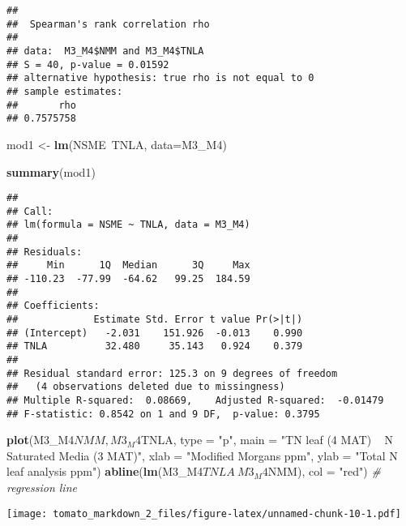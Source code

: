 \documentclass[]{article}
\newenvironment{Shaded}{\begin{snugshade}}{\end{snugshade}}
\newcommand{\KeywordTok}[1]{\textcolor[rgb]{0.13,0.29,0.53}{\textbf{{#1}}}}
\newcommand{\DataTypeTok}[1]{\textcolor[rgb]{0.13,0.29,0.53}{{#1}}}
\newcommand{\StringTok}[1]{\textcolor[rgb]{0.31,0.60,0.02}{{#1}}}
\newcommand{\CommentTok}[1]{\textcolor[rgb]{0.56,0.35,0.01}{\textit{{#1}}}}
\newcommand{\OtherTok}[1]{\textcolor[rgb]{0.56,0.35,0.01}{{#1}}}
\newcommand{\NormalTok}[1]{{#1}}
\begin{document}
\begin{verbatim}
## 
##  Spearman's rank correlation rho
## 
## data:  M3_M4$NMM and M3_M4$TNLA
## S = 40, p-value = 0.01592
## alternative hypothesis: true rho is not equal to 0
## sample estimates:
##       rho 
## 0.7575758
\end{verbatim}

\begin{Shaded}
\begin{Highlighting}[]
\NormalTok{mod1 <-}\StringTok{ }\KeywordTok{lm}\NormalTok{(NSME~TNLA, }\DataTypeTok{data=}\NormalTok{M3_M4)}

\KeywordTok{summary}\NormalTok{(mod1)}
\end{Highlighting}
\end{Shaded}

\begin{verbatim}
## 
## Call:
## lm(formula = NSME ~ TNLA, data = M3_M4)
## 
## Residuals:
##     Min      1Q  Median      3Q     Max 
## -110.23  -77.99  -64.62   99.25  184.59 
## 
## Coefficients:
##             Estimate Std. Error t value Pr(>|t|)
## (Intercept)   -2.031    151.926  -0.013    0.990
## TNLA          32.480     35.143   0.924    0.379
## 
## Residual standard error: 125.3 on 9 degrees of freedom
##   (4 observations deleted due to missingness)
## Multiple R-squared:  0.08669,    Adjusted R-squared:  -0.01479 
## F-statistic: 0.8542 on 1 and 9 DF,  p-value: 0.3795
\end{verbatim}

\begin{Shaded}
\begin{Highlighting}[]
\KeywordTok{plot}\NormalTok{(M3_M4$NMM, M3_M4$TNLA, }\DataTypeTok{type =} \StringTok{"p"}\NormalTok{, }\DataTypeTok{main =} \StringTok{"TN leaf (4 MAT) ~ N Saturated Media (3 MAT)"}\NormalTok{, }\DataTypeTok{xlab =} \StringTok{"Modified Morgans ppm"}\NormalTok{, }\DataTypeTok{ylab =} \StringTok{"Total N leaf analysis ppm"}\NormalTok{)}
\KeywordTok{abline}\NormalTok{(}\KeywordTok{lm}\NormalTok{(M3_M4$TNLA~M3_M4$NMM), }\DataTypeTok{col =} \StringTok{"red"}\NormalTok{) }\CommentTok{# regression line}
\end{Highlighting}
\end{Shaded}

\texttt{[image: tomato\_markdown\_2\_files/figure-latex/unnamed-chunk-10-1.pdf]}

\begin{Shaded}
\end{Shaded}
\end{document}
